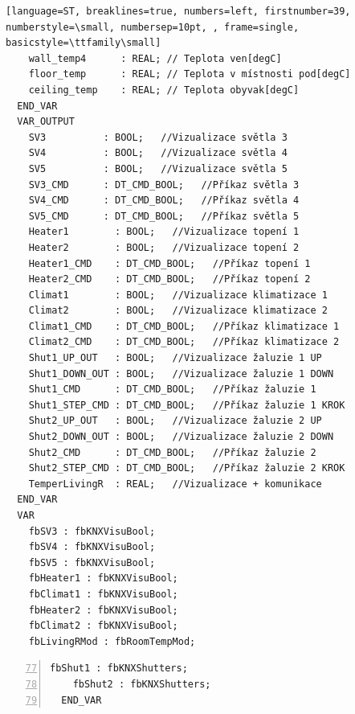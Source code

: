 \begin{lstlisting}[language=ST, breaklines=true, numbers=left, firstnumber=39, numberstyle=\small, numbersep=10pt, , frame=single, basicstyle=\ttfamily\small]
    wall_temp4      : REAL; // Teplota ven[degC]
    floor_temp      : REAL; // Teplota v místnosti pod[degC]
    ceiling_temp    : REAL; // Teplota obyvak[degC]
  END_VAR
  VAR_OUTPUT
    SV3          : BOOL;   //Vizualizace světla 3
    SV4          : BOOL;   //Vizualizace světla 4
    SV5          : BOOL;   //Vizualizace světla 5
    SV3_CMD      : DT_CMD_BOOL;   //Příkaz světla 3
    SV4_CMD      : DT_CMD_BOOL;   //Příkaz světla 4
    SV5_CMD      : DT_CMD_BOOL;   //Příkaz světla 5
    Heater1        : BOOL;   //Vizualizace topení 1
    Heater2        : BOOL;   //Vizualizace topení 2
    Heater1_CMD    : DT_CMD_BOOL;   //Příkaz topení 1
    Heater2_CMD    : DT_CMD_BOOL;   //Příkaz topení 2
    Climat1        : BOOL;   //Vizualizace klimatizace 1
    Climat2        : BOOL;   //Vizualizace klimatizace 2
    Climat1_CMD    : DT_CMD_BOOL;   //Příkaz klimatizace 1
    Climat2_CMD    : DT_CMD_BOOL;   //Příkaz klimatizace 2
    Shut1_UP_OUT   : BOOL;   //Vizualizace žaluzie 1 UP
    Shut1_DOWN_OUT : BOOL;   //Vizualizace žaluzie 1 DOWN
    Shut1_CMD      : DT_CMD_BOOL;   //Příkaz žaluzie 1
    Shut1_STEP_CMD : DT_CMD_BOOL;   //Příkaz žaluzie 1 KROK
    Shut2_UP_OUT   : BOOL;   //Vizualizace žaluzie 2 UP
    Shut2_DOWN_OUT : BOOL;   //Vizualizace žaluzie 2 DOWN
    Shut2_CMD      : DT_CMD_BOOL;   //Příkaz žaluzie 2
    Shut2_STEP_CMD : DT_CMD_BOOL;   //Příkaz žaluzie 2 KROK
    TemperLivingR  : REAL;   //Vizualizace + komunikace
  END_VAR
  VAR
    fbSV3 : fbKNXVisuBool;
    fbSV4 : fbKNXVisuBool;
    fbSV5 : fbKNXVisuBool;
    fbHeater1 : fbKNXVisuBool;
    fbClimat1 : fbKNXVisuBool;
    fbHeater2 : fbKNXVisuBool;
    fbClimat2 : fbKNXVisuBool;
    fbLivingRMod : fbRoomTempMod;
\end{lstlisting}
\pagebreak
\begin{lstlisting}[language=ST, breaklines=true, numbers=left, firstnumber=77, numberstyle=\small, numbersep=10pt, frame=single, basicstyle=\ttfamily\small]
    fbShut1 : fbKNXShutters;
    fbShut2 : fbKNXShutters;
  END_VAR
\end{lstlisting}
